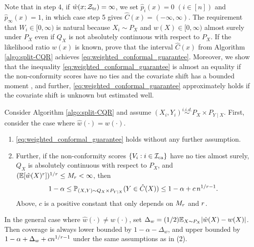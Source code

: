Note that in step 4, if $\hat{w}(x; \mathcal{Z}_{\mathrm{tr}}) = \infty$, we
  set $\hat{p}_{i}(x) = 0\,\, (i\in [n])$ and
  $\hat{p}_{\infty}(x) = 1$, in which case step 5 gives
  $\hat{C}(x) = (-\infty, \infty)$. The requirement that
  $W_i\in [0, \infty)$ is natural because $X_{i}\sim P_{X}$ and
  $w(X)\in [0, \infty)$ almost surely under $P_{X}$ even if $Q_{X}$ is
  not absolutely continuous with respect to $P_{X}$. If the
likelihood ratio $w(x)$ is known, \cite{barber2019conformal} prove
that the interval $\hat{C}(x)$ from Algorithm \ref{algo:split-CQR}
achieves \eqref{eq:weighted_conformal_guarantee}.
Moreover, %
we show that the inequality
\eqref{eq:weighted_conformal_guarantee} is almost an equality if the
non-conformity scores have no ties and the covariate shift has a
bounded moment , and further, \eqref{eq:weighted_conformal_guarantee} approximately holds if the covariate shift is unknown but estimated well.
\begin{proposition}\label{prop:equal}
  Consider Algorithm \ref{algo:split-CQR} and assume
  $(X_{i}, Y_{i})\stackrel{i.i.d.}{\sim} P_{X}\times P_{Y \mid
    X}$. First, consider the case where $\hat{w}(\cdot) = w(\cdot)$.
    \begin{enumerate}[(1)]
    \item \eqref{eq:weighted_conformal_guarantee} holds without any
      further assumption.
    \item Further, if the non-conformity scores
      $\{V_{i}: i\in \mathcal{I}_{\mathrm{ca}}\}$ have no ties almost surely, $Q_{X}$
      is absolutely continuous with respect to $P_{X}$, and
      $(\mathbb{E}[\hat{w}(X)^{r}])^{1/r} \le M_{r} < \infty$, then
  \[1 - \alpha \le \mathbb{P}_{(X, Y)\sim Q_{X}\times P_{Y \mid X}}(Y \in
    \hat{C}(X))\le 1 - \alpha + c \, n^{1 / r - 1}.
  \]
  Above, $c$ is a positive constant that only depends on $M_{r}$ and $r$.
\end{enumerate}
In the general case where $\hat{w}(\cdot) \neq w(\cdot)$, set
$\Delta_{w} = (1/2)\mathbb{E}_{X\sim P_{X}}|\hat{w}(X) - w(X)|$. Then coverage
is always lower bounded by $1 - \alpha - \Delta_{w}$, and upper
bounded by $1 - \alpha + \Delta_{w} + cn^{1/r - 1}$ under the same
assumptions as in (2).
  \end{proposition}
